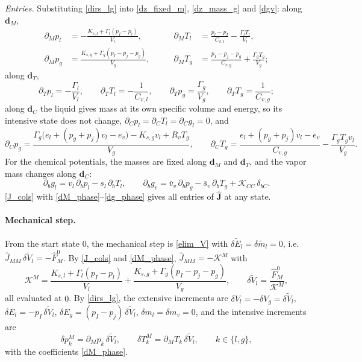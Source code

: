 \emph{Entries.} Substituting \eqref{dirs_lg} into \eqref{dz_fixed_m}, \eqref{dz_mass_g} and \eqref{dgv}: along $\boldsymbol{d}_M$,
\begin{equation}\label{dM_phase}
\begin{aligned}
\partial_Mp_l&=-\frac{K_{s,l}+\Gamma_l(p_I-p_l)}{V_l}, &\qquad \partial_MT_l&=\frac{p_l-p_I}{C_{v,l}}-\frac{\Gamma_lT_l}{V_l},\\
\partial_Mp_g&=\frac{K_{s,g}+\Gamma_g(p_I-p_{j}-p_g)}{V_g}, &\qquad \partial_MT_g&=\frac{p_I-p_{j}-p_g}{C_{v,g}}+\frac{\Gamma_gT_g}{V_g};
\end{aligned}
\end{equation}
along $\boldsymbol{d}_T$,
\begin{equation}\label{dT_phase}
\partial_Tp_l=-\frac{\Gamma_l}{V_l},\qquad \partial_TT_l=-\frac1{C_{v,l}},\qquad \partial_Tp_g=\frac{\Gamma_g}{V_g},\qquad \partial_TT_g=\frac1{C_{v,g}};
\end{equation}
along $\boldsymbol{d}_C$ the liquid gives mass at its own specific volume and energy, so its intensive state does not change, $\partial_Cp_l=\partial_CT_l=\partial_Cg_l=0$, and
\begin{equation}\label{dC_phase}
\partial_Cp_g=\frac{\Gamma_g\bigl(e_l+(p_g+p_{j})v_l-e_v\bigr)-K_{s,g}v_l+R_vT_g}{V_g},\qquad
\partial_CT_g=\frac{e_l+(p_g+p_{j})v_l-e_v}{C_{v,g}}-\frac{\Gamma_gT_gv_l}{V_g}.
\end{equation}
For the chemical potentials, the masses are fixed along $\boldsymbol{d}_M$ and $\boldsymbol{d}_T$, and the vapor mass changes along $\boldsymbol{d}_C$:
\begin{equation}\label{dg_phase}
\partial_bg_l=v_l\,\partial_bp_l-s_l\,\partial_bT_l,\qquad \partial_bg_v=\bar v_v\,\partial_bp_g-\bar s_v\,\partial_bT_g+\mathcal{K}_{CC}\,\delta_{bC}.
\end{equation}
\eqref{J_cols} with \eqref{dM_phase}--\eqref{dg_phase} gives all entries of $\hat{\boldsymbol{J}}$ at any state.

\paragraph{Mechanical step.}
From the start state $0$, the mechanical step is \eqref{elim_V} with $\delta\tilde{E}_l=\delta\tilde{m}_l=0$, i.e.\ $\hat{J}_{MM}\,\delta\tilde{V}_l=-\hat{F}_M^0$. By \eqref{J_cols} and \eqref{dM_phase}, $\hat{J}_{MM}=-\mathcal{K}^M$ with
\begin{equation}\label{K_M}
\mathcal{K}^M=\frac{K_{s,l}+\Gamma_l(p_I-p_l)}{V_l}+\frac{K_{s,g}+\Gamma_g(p_I-p_{j}-p_g)}{V_g},\qquad \delta\tilde{V}_l=\frac{\hat{F}_M^0}{\mathcal{K}^M},
\end{equation}
all evaluated at $0$. By \eqref{dirs_lg}, the extensive increments are $\delta V_l=-\delta V_g=\delta\tilde{V}_l$, $\delta E_l=-p_I\,\delta\tilde{V}_l$, $\delta E_g=(p_I-p_{j})\,\delta\tilde{V}_l$, $\delta m_l=\delta m_v=0$, and the intensive increments are
\begin{equation}\label{incr_M}
\delta p_k^M=\partial_Mp_k\,\delta\tilde{V}_l,\qquad \delta T_k^M=\partial_MT_k\,\delta\tilde{V}_l,\qquad k\in\{l,g\},
\end{equation}
with the coefficients \eqref{dM_phase}.

